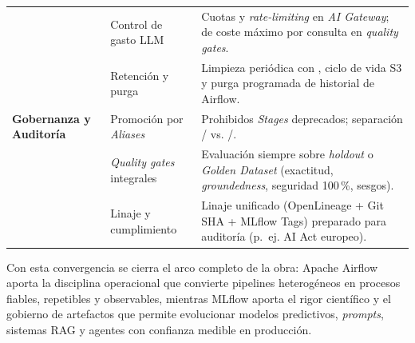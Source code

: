 \begin{table}[htbp]
\begin{tabularx}{\textwidth}{@{}L{2.4cm} L{4.1cm} Y@{}}
 &
Control de gasto LLM &
Cuotas y \textit{rate-limiting} en \textit{AI Gateway};  de coste máximo por consulta en \textit{quality gates}. \\
 &
Retención y purga &
Limpieza periódica con , ciclo de vida S3 y purga programada de historial de Airflow. \\
\midrule
\textbf{Gobernanza y Auditoría} &
Promoción por \textit{Aliases} &
Prohibidos \textit{Stages} deprecados; separación / vs. /. \\
 &
\textit{Quality gates} integrales &
Evaluación siempre sobre \textit{holdout} o \textit{Golden Dataset} (exactitud, \textit{groundedness}, seguridad 100\,\%, sesgos). \\
 &
Linaje y cumplimiento &
Linaje unificado (OpenLineage + Git SHA + MLflow Tags) preparado para auditoría (p.~ej. AI Act europeo). \\
\bottomrule
\end{tabularx}
\end{table}

Con esta convergencia se cierra el arco completo de la obra: Apache Airflow aporta la disciplina operacional que convierte pipelines heterogéneos en procesos fiables, repetibles y observables, mientras MLflow aporta el rigor científico y el gobierno de artefactos que permite evolucionar modelos predictivos, \textit{prompts}, sistemas RAG y agentes con confianza medible en producción.
